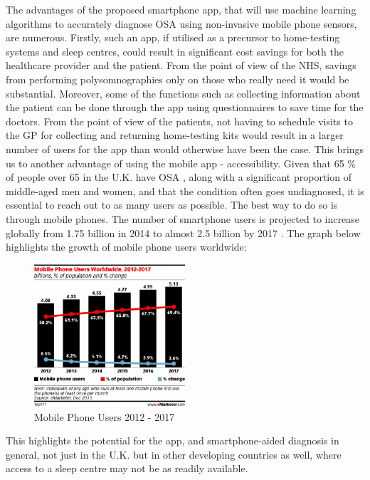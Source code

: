The advantages of the proposed smartphone app, that will use machine learning algorithms to accurately diagnose OSA using non-invasive mobile phone sensors, are numerous. Firstly, such an app, if utilised as a precursor to home-testing systems and sleep centres, could result in significant cost savings for both the healthcare provider and the patient. From the point of view of the NHS, savings from performing polysomnographies only on those who really need it would be substantial. Moreover, some of the functions such as collecting information about the patient can be done through the app using questionnaires to save time for the doctors. From the point of view of the patients, not having to schedule visits to the GP for collecting and returning home-testing kits would result in a larger number of users for the app than would otherwise have been the case.
This brings us to another advantage of using the mobile app - accessibility. Given that 65 \% of people over 65 in the U.K. have OSA \cite{nhsmain}, along with a significant proportion of middle-aged men and women, and that the condition often goes undiagnosed, it is essential to reach out to as many users as possible. The best way to do so is through mobile phones. The number of smartphone users is projected to increase globally from 1.75 billion in 2014 to almost 2.5 billion by 2017 \cite{phoneusers}. The graph below highlights the growth of mobile phone users worldwide:

\begin{figure}[!ht]
\centering
\includegraphics[width=0.5\textwidth]{drawings/mobilephoneusers.png}
\caption{Mobile Phone Users 2012 - 2017 \cite{phoneusers}}
\label{fig:mobilephoneusers}
\end{figure}

This highlights the potential for the app, and smartphone-aided diagnosis in general, not just in the U.K. but in other developing countries as well, where access to a sleep centre may not be as readily available.


